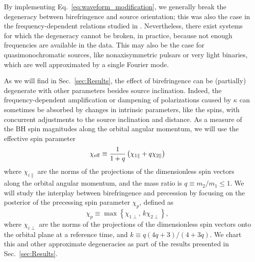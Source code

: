 \documentclass[aps,prd,twocolumn,superscriptaddress,preprintnumbers,nofootinbib]{revtex4-2}
\begin{document}
By implementing Eq.~\eqref{eq:waveform_modification}, we generally break the degeneracy between birefringence and source orientation; this was also the case in the frequency-dependent relations studied in \cite{Yamada_2020,Wang_2021}.
Nevertheless, there exist systems for which the degeneracy cannot be broken, in practice, because not enough frequencies are available in the data.
This may also be the case for quasimonochromatic sources, like nonaxisymmetric pulsars or very light binaries, which are well approximated by a single Fourier mode.

As we will find in Sec.~\ref{sec:Results}, the effect of birefringence can be (partially) degenerate with other parameters besides source inclination.
Indeed, the frequency-dependent amplification or dampening of polarizations caused by $\kappa$ can sometimes be absorbed by changes in intrinsic parameters, like the spins, with concurrent adjustments to the source inclination and distance.
As a measure of the \ac{BH} spin magnitudes along the orbital angular momentum, we will use the effective spin parameter \cite{Damour:2001tu,Ajith:2009bn,Santamaria:2010yb}
\begin{equation}
\chi_{\rm eff} \equiv \frac{1}{1+q} \left(\chi_{1\parallel} + q\chi_{2\parallel}\right)
\end{equation}
where $\chi_{i\parallel}$ are the norms of the projections of the dimensionless spin vectors along the orbital angular momentum, and the mass ratio is $q \equiv m_2/m_1 \leq 1$.
We will study the interplay between birefringence and precession by focusing on the posterior of the precessing spin parameter $\chi_p$, defined as \cite{Schmidt:2014iyl}
\begin{equation}
\chi_p \equiv \max\left\{ \chi_{1\perp},\, k \chi_{2\perp}\right\} ,
\end{equation}
where $\chi_{i\perp}$ are the norms of the projections of the dimensionless spin vectors onto the orbital plane at a reference time, and $k \equiv q\left(4 q +3\right) / \left(4 + 3q\right)$.
We chart this and other approximate degeneracies as part of the results presented in Sec.~\ref{sec:Results}.

\end{document}
